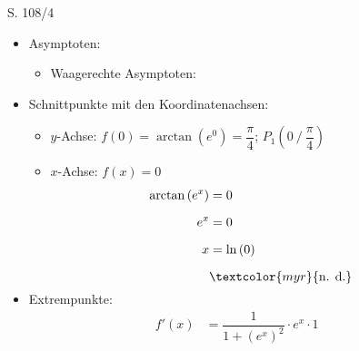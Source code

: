\begin{Exercise}{S. 108/4}{}
\begin{enumerate}
\begin{enumerate}[label=\alph*),leftmargin=*]
{\begin{itemize}[leftmargin=*]
{\begin{align*}
                    \end{align*}
                    }
                \item Asymptoten: \\[-3.0ex]{
                    \begin{itemize}
                        \item Waagerechte Asymptoten: 
                    \end{itemize}
                    }
                \item Schnittpunkte mit den Koordinatenachsen: \\[-2.0ex]{
                    \begin{itemize}
                        \item $y$-Achse: \quad $f(0) = \arctan\left(e^{0}\right) = \dfrac{\pi}{4}$; \qquad $P_{1} \left( 0 \ / \ \dfrac{\pi}{4} \right)$\\[-1.0ex]
                        \item $x$-Achse: \quad $f(x) = 0$ \\[-2.0ex]{
                            \begin{align*}
                                \arctan\left(e^{x}\right) &= 0 &&\\[1.5ex]
                                e^{x} &= 0 &&\\[1.5ex]
                                x&= \ln\left(0\right)\\[1.5ex]
                                & \textcolor{myr}{\text{n. d.}}\\[-1.5ex]
                            \end{align*}
                            }
                    \end{itemize}
                    }
                \item Extrempunkte: \\[-3.0ex]{
                    \begin{align*}
                        f'(x) &= \dfrac{1}{1 + \left(e^{x}\right)^{2}} \cdot e^{x} \cdot 1&&\\[1.5ex]

\end{align*}}
\end{itemize}}
\end{enumerate}
\end{enumerate}
\end{Exercise}

